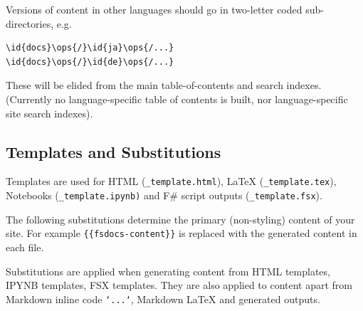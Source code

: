 \documentclass{article}
\newcommand{\id}[1]{\textcolor{black}{#1}}
\newcommand{\ops}[1]{\textcolor{purple}{#1}}
\begin{document}
Versions of content in other languages should go in two-letter coded sub-directories, e.g.
\begin{Verbatim}[commandchars=\\\{\}]
\id{docs}\ops{/}\id{ja}\ops{/...}
\id{docs}\ops{/}\id{de}\ops{/...}

\end{Verbatim}



These will be elided from the main table-of-contents and search indexes.  (Currently no language-specific
table of contents is built, nor language-specific site search indexes).
\subsection*{Templates and Substitutions}



Templates are used for HTML (\texttt{\_template.html}), LaTeX (\texttt{\_template.tex}), Notebooks (\texttt{\_template.ipynb)}
and F\# script outputs (\texttt{\_template.fsx}).


The following substitutions determine the primary (non-styling) content of your site.
For example \texttt{\{\{fsdocs-content\}\}} is replaced with the generated content in each file.


Substitutions are applied when generating content from HTML templates, IPYNB templates, FSX templates.
They are also applied to content apart from Markdown inline code \texttt{`...`}, Markdown LaTeX and
generated outputs.
\end{document}
